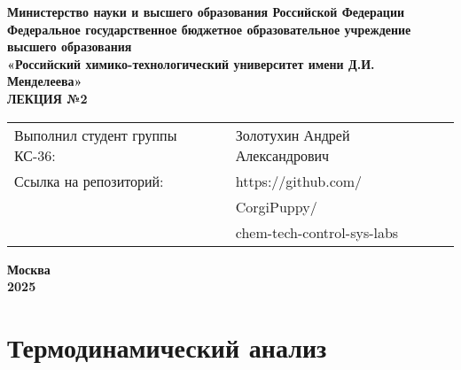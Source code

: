 \documentclass[12pt, a4paper]{report}
\begin{document}
	\begin{titlepage}
		\begin{center}
			\large \textbf{Министерство науки и высшего образования Российской Федерации} \\
			\large \textbf{Федеральное государственное бюджетное образовательное учреждение высшего образования} \\
			\large \textbf{«Российский химико-технологический университет имени Д.И. Менделеева»} \\

			\vspace*{6cm}
			\LARGE \textbf{ЛЕКЦИЯ №2}

			\vspace*{4cm}
			\begin{flushright}
				\Large
				\begin{tabular}{>{\raggedleft\arraybackslash}p{9cm} p{10cm}}
					Выполнил студент группы КС-36: & Золотухин Андрей Александрович \\
					Ссылка на репозиторий: & https://github.com/ \\
					& CorgiPuppy/ \\
					& chem-tech-control-sys-labs \\
				\end{tabular}
			\end{flushright}

			\vspace*{5cm}
			\Large \textbf{Москва \\ 2025}
		\end{center}
	\end{titlepage}

	\tableofcontents
	\thispagestyle{empty}
	\newpage


	\section*{Термодинамический анализ}
\end{document}
